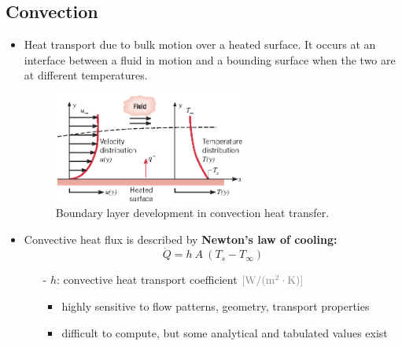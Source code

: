 \documentclass[12pt, a4paper]{article}
\numberwithin{equation}{subsection}
\begin{document}
\subsection{Convection}
\begin{itemize}
    \item Heat transport due to bulk motion over a heated surface. It occurs at an interface between a fluid in motion and a bounding surface when the two are at different temperatures.

    \begin{figure}[H]
        \centering
        \includegraphics[width = 0.6\textwidth]{img/convection.eps}
        \caption{Boundary layer development in convection heat transfer.}
    \end{figure}

    \item Convective heat flux is described by \textbf{Newton’s law of cooling:}
    \[ 
        \dot{Q} = h \ A \ (T_{s} - T_{\infty}) 
    \]
    
    \begin{itemize}
        \item[-] $h$: convective heat transport coefficient $\color{gray}{\mathrm{[W/(m^{2}\cdot K)]}}$
        \begin{itemize}
            \item highly sensitive to flow patterns, geometry, transport properties
            \item difficult to compute, but some analytical and tabulated values exist
        \end{itemize}
    \end{itemize}


\end{itemize}
\end{document}
